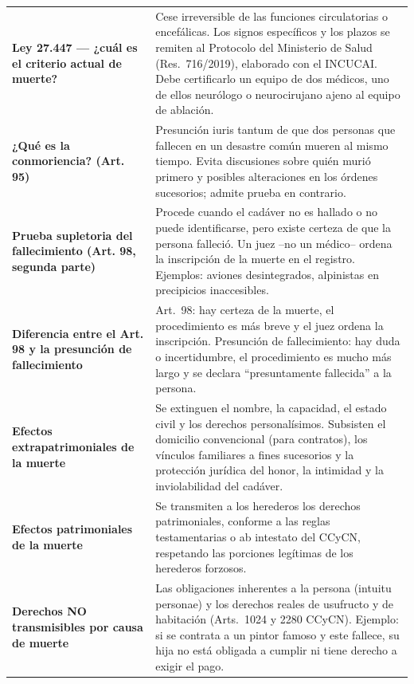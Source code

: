 \documentclass[12pt,oneside]{book}
\begin{document}
\begin{longtable}{
    >{\raggedright\arraybackslash}p{}
    >{\raggedright\arraybackslash}p{}
}
\textbf{Ley 27.447 --- ¿cuál es el criterio actual de muerte?} &
Cese irreversible de las funciones circulatorias o encefálicas. Los signos específicos y los plazos se remiten al Protocolo del Ministerio de Salud (Res.\ 716/2019), elaborado con el INCUCAI. Debe certificarlo un equipo de dos médicos, uno de ellos neurólogo o neurocirujano ajeno al equipo de ablación. \\

\textbf{¿Qué es la conmoriencia? (Art. 95)} &
Presunción iuris tantum de que dos personas que fallecen en un desastre común mueren al mismo tiempo. Evita discusiones sobre quién murió primero y posibles alteraciones en los órdenes sucesorios; admite prueba en contrario. \\

\textbf{Prueba supletoria del fallecimiento (Art. 98, segunda parte)} &
Procede cuando el cadáver no es hallado o no puede identificarse, pero existe certeza de que la persona falleció. Un juez --no un médico-- ordena la inscripción de la muerte en el registro. Ejemplos: aviones desintegrados, alpinistas en precipicios inaccesibles. \\

\textbf{Diferencia entre el Art. 98 y la presunción de fallecimiento} &
Art.\ 98: hay certeza de la muerte, el procedimiento es más breve y el juez ordena la inscripción. Presunción de fallecimiento: hay duda o incertidumbre, el procedimiento es mucho más largo y se declara ``presuntamente fallecida'' a la persona. \\

\textbf{Efectos extrapatrimoniales de la muerte} &
Se extinguen el nombre, la capacidad, el estado civil y los derechos personalísimos. Subsisten el domicilio convencional (para contratos), los vínculos familiares a fines sucesorios y la protección jurídica del honor, la intimidad y la inviolabilidad del cadáver. \\

\textbf{Efectos patrimoniales de la muerte} &
Se transmiten a los herederos los derechos patrimoniales, conforme a las reglas testamentarias o ab intestato del CCyCN, respetando las porciones legítimas de los herederos forzosos. \\

\textbf{Derechos NO transmisibles por causa de muerte} &
Las obligaciones inherentes a la persona (intuitu personae) y los derechos reales de usufructo y de habitación (Arts.\ 1024 y 2280 CCyCN). Ejemplo: si se contrata a un pintor famoso y este fallece, su hija no está obligada a cumplir ni tiene derecho a exigir el pago. \\


\end{longtable}
\end{document}
